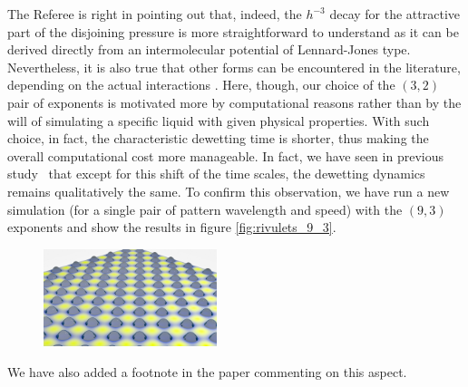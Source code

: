 \documentclass[12pt,english]{article}
\begin{document}
\begin{itemize}
{\item[ \textbf{Answer}]
{
The Referee is right in pointing out that, indeed, the $h^{-3}$ decay 
for the attractive part of the disjoining pressure is more straightforward 
to understand as it can be derived directly from an intermolecular potential of Lennard-Jones type. Nevertheless, it is also true that other forms
can be encountered in the literature, depending on the actual interactions
\cite{PhysRevE.63.011208}. Here, though, our choice of the $(3,2)$ pair of exponents is motivated more by computational reasons rather than by the will of 
simulating a specific liquid with given physical properties.
With such choice, in fact, the characteristic dewetting time 
is shorter, thus making the overall computational cost more manageable.
In fact, we have seen in previous study~\cite{PhysRevE.104.034801} that
except for this shift of the time scales, the dewetting dynamics remains 
qualitatively the same. To confirm this observation, we have run 
a new simulation (for a single pair of pattern wavelength and speed) 
with the $(9,3)$ exponents and show the results in figure \ref{fig:rivulets_9_3}.
\begin{figure}
    \centering
    \includegraphics[width=0.45\textwidth]{Figures/No_vel_render2.png}
    \caption{}
    \label{fig:rivulets9_3}
\end{figure}
We have also added a footnote in the paper commenting on this aspect.
}

}
\end{itemize}
\end{document}
